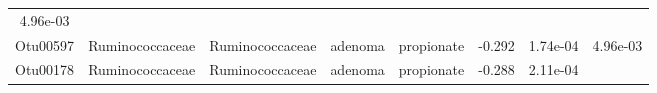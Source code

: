 \documentclass[11pt,]{article}
\begin{document}
\begin{longtable}[]{@{}cccccccc@{}}
\begin{minipage}[t]{0.08\columnwidth}
4.96e-03\strut
\end{minipage}\tabularnewline
\begin{minipage}[t]{0.08\columnwidth}\centering\strut
Otu00597\strut
\end{minipage} & \begin{minipage}[t]{0.15\columnwidth}\centering\strut
Ruminococcaceae\strut
\end{minipage} & \begin{minipage}[t]{0.15\columnwidth}\centering\strut
Ruminococcaceae\strut
\end{minipage} & \begin{minipage}[t]{0.08\columnwidth}\centering\strut
adenoma\strut
\end{minipage} & \begin{minipage}[t]{0.09\columnwidth}\centering\strut
propionate\strut
\end{minipage} & \begin{minipage}[t]{0.07\columnwidth}\centering\strut
-0.292\strut
\end{minipage} & \begin{minipage}[t]{0.08\columnwidth}\centering\strut
1.74e-04\strut
\end{minipage} & \begin{minipage}[t]{0.08\columnwidth}\centering\strut
4.96e-03\strut
\end{minipage}\tabularnewline
\begin{minipage}[t]{0.08\columnwidth}\centering\strut
Otu00178\strut
\end{minipage} & \begin{minipage}[t]{0.15\columnwidth}\centering\strut
Ruminococcaceae\strut
\end{minipage} & \begin{minipage}[t]{0.15\columnwidth}\centering\strut
Ruminococcaceae\strut
\end{minipage} & \begin{minipage}[t]{0.08\columnwidth}\centering\strut
adenoma\strut
\end{minipage} & \begin{minipage}[t]{0.09\columnwidth}\centering\strut
propionate\strut
\end{minipage} & \begin{minipage}[t]{0.07\columnwidth}\centering\strut
-0.288\strut
\end{minipage} & \begin{minipage}[t]{0.08\columnwidth}\centering\strut
2.11e-04\strut
\end{minipage} & \begin{minipage}[t]{0.08\columnwidth}\centering\strut

\end{minipage}
\end{longtable}
\end{document}
